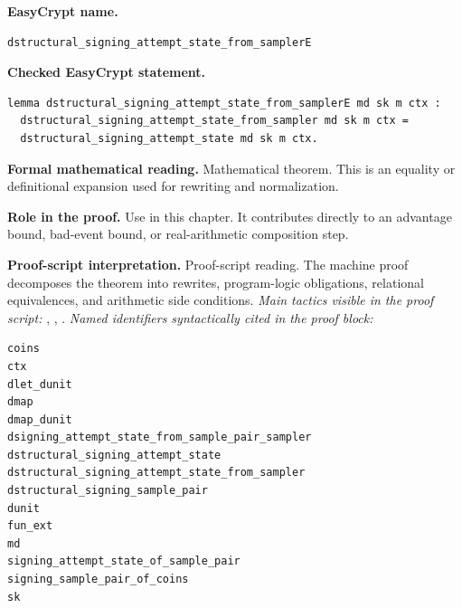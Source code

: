 \begin{formaltheorem}
\noindent\textbf{EasyCrypt name.}
\begin{lstlisting}[language=EasyCrypt,basicstyle=\ttfamily\scriptsize]
dstructural_signing_attempt_state_from_samplerE
\end{lstlisting}
\noindent\textbf{Checked EasyCrypt statement.}
\begin{lstlisting}[language=EasyCrypt,basicstyle=\ttfamily\scriptsize]
lemma dstructural_signing_attempt_state_from_samplerE md sk m ctx :
  dstructural_signing_attempt_state_from_sampler md sk m ctx =
  dstructural_signing_attempt_state md sk m ctx.
\end{lstlisting}
\noindent\textbf{Formal mathematical reading.}
Mathematical theorem. This is an equality or definitional expansion used for rewriting and normalization.

\noindent\textbf{Role in the proof.}
Use in this chapter. It contributes directly to an advantage bound, bad-event bound, or real-arithmetic composition step.

\noindent\textbf{Proof-script interpretation.}
Proof-script reading. The machine proof decomposes the theorem into rewrites, program-logic obligations, relational equivalences, and arithmetic side conditions.
\emph{Main tactics visible in the proof script:} , , .
\emph{Named identifiers syntactically cited in the proof block:}
\begin{lstlisting}[language=EasyCrypt,basicstyle=\ttfamily\scriptsize]
coins
ctx
dlet_dunit
dmap
dmap_dunit
dsigning_attempt_state_from_sample_pair_sampler
dstructural_signing_attempt_state
dstructural_signing_attempt_state_from_sampler
dstructural_signing_sample_pair
dunit
fun_ext
md
signing_attempt_state_of_sample_pair
signing_sample_pair_of_coins
sk
\end{lstlisting}

\end{formaltheorem}

